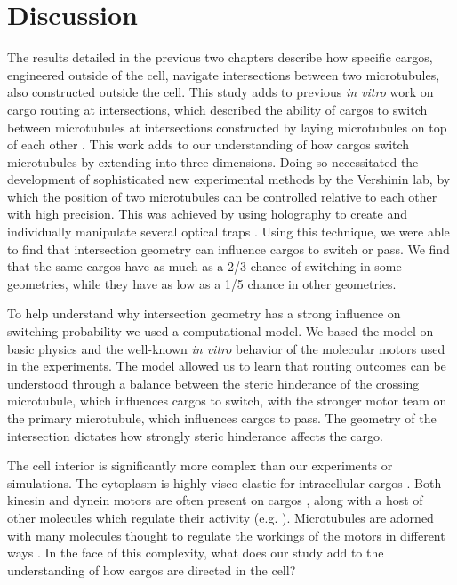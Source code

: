 \chapter{Discussion}

The results detailed in the previous two chapters describe how specific cargos, engineered outside of the cell, navigate intersections between two microtubules, also constructed outside the cell.
This study adds to previous \textit{in vitro} work on cargo routing at intersections, which described the ability of cargos to switch between microtubules at intersections constructed by laying microtubules on top of each other \cite{Ross2008}.
This work adds to our understanding of how cargos switch microtubules by extending into three dimensions.
Doing so necessitated the development of sophisticated new experimental methods by the Vershinin lab, by which the position of two microtubules can be controlled relative to each other with high precision.
This was achieved by using holography to create and individually manipulate several optical traps \cite{Bergman2015}.
Using this technique, we were able to find that intersection geometry can influence cargos to switch or pass.
We find that the same cargos have as much as a 2/3 chance of switching in some geometries, while they have as low as a 1/5 chance in other geometries.

To help understand why intersection geometry has a strong influence on switching probability we used a computational model.
We based the model on basic physics and the well-known \textit{in vitro} behavior of the molecular motors used in the experiments.
The model allowed us to learn that routing outcomes can be understood through a balance between the steric hinderance of the crossing microtubule, which influences cargos to switch, with the stronger motor team on the primary microtubule, which influences cargos to pass.
The geometry of the intersection dictates how strongly steric hinderance affects the cargo.

The cell interior is significantly more complex than our experiments or simulations.
The cytoplasm is highly visco-elastic for intracellular cargos \cite{Guo2014,Ahmed2018}.
Both kinesin and dynein motors are often present on cargos \cite{Gross2004,Hancock2014}, along with a host of other molecules which regulate their activity (e.g. \cite{Reddy2016}).
Microtubules are adorned with many molecules thought to regulate the workings of the motors in different ways \cite{Yu2015,Sirajuddin2014}.
In the face of this complexity, what does our study add to the understanding of how cargos are directed in the cell?

